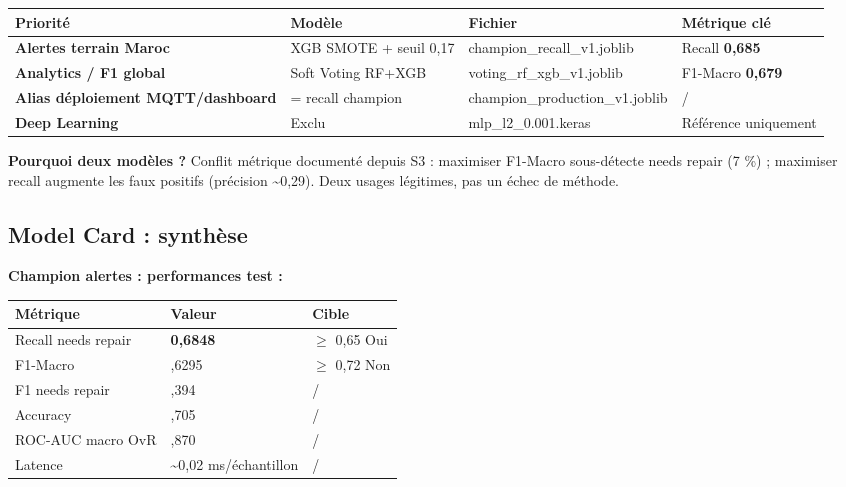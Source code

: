 \documentclass[11pt,a4paper]{report}
\begin{document}
{\small
\begin{longtable}{@{}>{\raggedright\arraybackslash}p{}>{\raggedright\arraybackslash}p{}>{\raggedright\arraybackslash}p{}>{\raggedright\arraybackslash}p{}@{}}
\toprule
\rowcolor{EHTPTableHead}Priorité & Modèle & Fichier & Métrique clé \\
\midrule
\textbf{Alertes terrain Maroc} & XGB SMOTE + seuil 0,17 & champion\_recall\_v1.joblib & Recall \textbf{0,685} \\
\textbf{Analytics / F1 global} & Soft Voting RF+XGB & voting\_rf\_xgb\_v1.joblib & F1-Macro \textbf{0,679} \\
\textbf{Alias déploiement MQTT/dashboard} & = recall champion & champion\_production\_v1.joblib & / \\
\textbf{Deep Learning} & Exclu & mlp\_l2\_0.001.keras & Référence uniquement \\
\bottomrule
\end{longtable}
}

\textbf{Pourquoi deux modèles ?} Conflit métrique documenté depuis S3 : maximiser F1-Macro sous-détecte needs repair (7 \%) ; maximiser recall augmente les faux positifs (précision \textasciitilde{}0,29). Deux usages légitimes, pas un échec de méthode.

\subsection{Model Card : synthèse}

\textbf{Champion alertes : performances test :}

{\small
\begin{longtable}{@{}>{\raggedright\arraybackslash}p{}>{\raggedright\arraybackslash}p{}>{\raggedright\arraybackslash}p{}@{}}
\toprule
\rowcolor{EHTPTableHead}Métrique & Valeur & Cible \\
\midrule
Recall needs repair & \textbf{0,6848} & $\geq$ 0,65 Oui \\
F1-Macro & 0,6295 & $\geq$ 0,72 Non \\
F1 needs repair & 0,394 & / \\
Accuracy & 0,705 & / \\
ROC-AUC macro OvR & 0,870 & / \\
Latence & \textasciitilde{}0,02 ms/échantillon & / \\
\bottomrule
\end{longtable}
}
\end{document}
